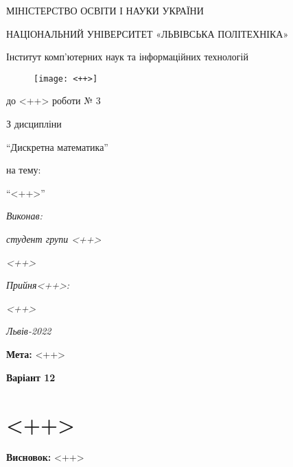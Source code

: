 \documentclass[12pt, final]{extreport}
\begin{document}

\pagestyle{empty}
\begin{center}

	{\fontsize{14}{24}\selectfont МІНІСТЕРСТВО ОСВІТИ І НАУКИ УКРАЇНИ

	НАЦІОНАЛЬНИЙ УНІВЕРСИТЕТ «ЛЬВІВСЬКА ПОЛІТЕХНІКА»

	Інститут комп'ютерних наук та інформаційних технологій

	}

	\vspace{90.4pt} %
	\begin{figure}[h]
		\centering
		\texttt{[image: <++>]}
	\end{figure}

	{\fontsize{18}{29}\selectfont{Звіт}

	{до <++> роботи № 3}

	{З дисципліни}

	{``Дискретна математика''}

	{на тему:}

	{``<++>''}

	}
\end{center}

\vspace{12.1pt} %
	{\fontsize{14}{22.4}\selectfont
\begin{flushright}
	\textit{Виконав:}

	\textit{студент групи <++>}

	\textit{<++>}

	\textit{Прийня<++>:}

	\textit{<++>}
\end{flushright}
\vspace{37.4pt} %
\begin{center}
\textit{Львів-2022}
\vspace{37.4pt} %
\end{center}
	}
\clearpage
{\fontsize{14}{16.1}\selectfont
\textbf{Мета:}
<++>

\vspace{16pt}
\centering \textbf{Варіант 12}
\section{<++>}
\begin{figure}[h]
	\centering
\end{figure}

\textbf{Висновок:}
<++>
}
\blindtext
\end{document}
